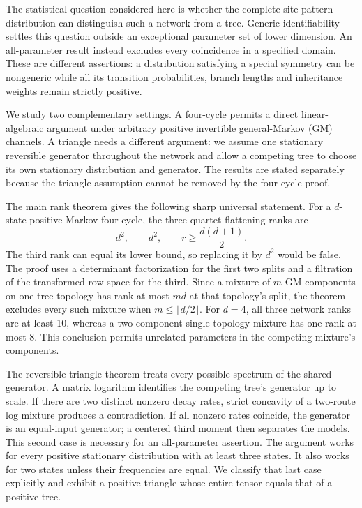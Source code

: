 \documentclass[11pt]{article}
\theoremstyle{definition}
\theoremstyle{remark}
\begin{document}
The statistical question considered here is whether the complete
site-pattern distribution can distinguish such a network from a tree.
Generic identifiability settles this question outside an exceptional
parameter set of lower dimension. An all-parameter result instead excludes
every coincidence in a specified domain. These are different assertions:
a distribution satisfying a special symmetry can be nongeneric while all
its transition probabilities, branch lengths and inheritance weights remain
strictly positive.

We study two complementary settings. A four-cycle permits a direct
linear-algebraic argument under arbitrary positive invertible general-Markov
(GM) channels. A triangle needs a different argument: we assume one
stationary reversible generator throughout the network and allow a competing
tree to choose its own stationary distribution and generator. The results
are stated separately because the triangle assumption cannot be removed
by the four-cycle proof.

The main rank theorem gives the following sharp universal statement. For a
$d$-state positive Markov four-cycle, the three quartet flattening ranks are
\[
 d^2,\qquad d^2,\qquad r\ge \frac{d(d+1)}2.
\]
The third rank can equal its lower bound, so replacing it by $d^2$ would be
false. The proof uses a determinant factorization for the first two splits
and a filtration of the transformed row space for the third. Since a
mixture of $m$ GM components on one tree topology has rank at most $md$ at
that topology's split, the theorem excludes every such mixture when
$m\le\lfloor d/2\rfloor$. For $d=4$, all three network ranks are at least
10, whereas a two-component single-topology mixture has one rank at most
8. This conclusion permits unrelated parameters in the competing mixture's
components.

The reversible triangle theorem treats every possible spectrum of the
shared generator. A matrix logarithm identifies the competing tree's
generator up to scale. If there are two distinct nonzero decay rates,
strict concavity of a two-route log mixture produces a contradiction.
If all nonzero rates coincide, the generator is an equal-input generator;
a centered third moment then separates the models. This second case is
necessary for an all-parameter assertion. The argument works for every
positive stationary distribution with at least three states. It also
works for two states unless their frequencies are equal. We classify that
last case explicitly and exhibit a positive triangle whose entire tensor
equals that of a positive tree.
\end{document}
